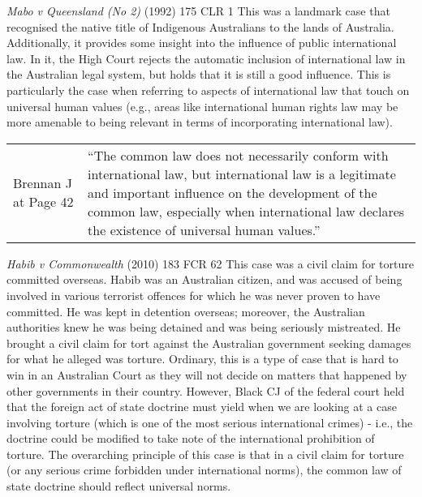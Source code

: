\begin{casedetails}{\textit{Mabo v Queensland (No 2)} (1992) 175 CLR 1}
    \flushleft
    This was a landmark case that recognised the native title of Indigenous Australians to the lands of Australia. Additionally, it provides some insight into the influence of public international law. In it, the High Court rejects the automatic inclusion of international law in the Australian legal system, but holds that it is still a good influence. This is particularly the case when referring to aspects of international law that touch on universal human values (e.g., areas like international human rights law may be more amenable to being relevant in terms of incorporating international law).

    \begin{longtable}{p{}|>{\raggedright\arraybackslash}p{}}
        Brennan J at Page 42 & ``The common law does not necessarily conform with international law, but international law is a legitimate and important influence on the development of the common law, especially when international law declares the existence of universal human values.''
    \end{longtable}
\end{casedetails}

\begin{casedetails}{\textit{Habib v Commonwealth} (2010) 183 FCR 62}
    \flushleft
    This case was a civil claim for torture committed overseas. Habib was an Australian citizen, and was accused of being involved in various terrorist offences for which he was never proven to have committed. He was kept in detention overseas; moreover, the Australian authorities knew he was being detained and was being seriously mistreated. He brought a civil claim for tort against the Australian government seeking damages for what he alleged was torture. Ordinary, this is a type of case that is hard to win in an Australian Court as they will not decide on matters that happened by other governments in their country. However, Black CJ of the federal court held that the foreign act of state doctrine must yield when we are looking at a case involving torture (which is one of the most serious international crimes) - i.e., the doctrine could be modified to take note of the international prohibition of torture. The overarching principle of this case is that in a civil claim for torture (or any serious crime forbidden under international norms), the common law of state doctrine should reflect universal norms.
\end{casedetails}

